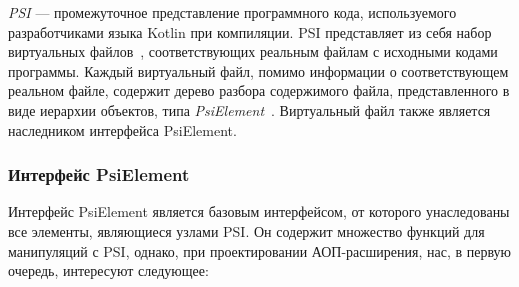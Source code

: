 \textit{PSI} --- промежуточное представление программного кода, используемого
разработчиками языка Kotlin при компиляции.
PSI представляет из себя набор виртуальных файлов~\cite{psi_file},
соответствующих реальным файлам с исходными кодами программы.
Каждый виртуальный файл, помимо информации о соответствующем реальном файле,
содержит дерево разбора содержимого файла, представленного в виде иерархии
объектов, типа \textit{PsiElement}~\cite{psi_element}.
Виртуальный файл также является наследником интерфейса PsiElement.
\subsubsection{Интерфейс PsiElement}
\label{ssub:psi_element_description}
Интерфейс PsiElement является базовым интерфейсом, от которого унаследованы все
элементы, являющиеся узлами PSI.
Он содержит множество функций для манипуляций с PSI, однако, при проектировании
АОП-расширения, нас, в первую очередь, интересуют следующее:

